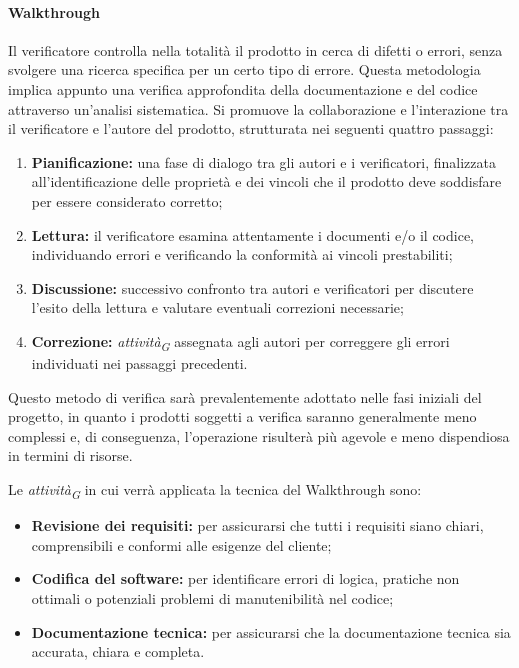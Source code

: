 \paragraph{Walkthrough}
Il verificatore controlla nella totalità il prodotto in cerca di difetti o errori, senza svolgere una ricerca specifica per un certo tipo di errore. Questa metodologia implica appunto una verifica approfondita della documentazione e del codice attraverso un'analisi sistematica. Si promuove la collaborazione e l'interazione tra il verificatore e l'autore del prodotto, strutturata nei seguenti quattro passaggi:

\begin{enumerate}
    \item \textbf{Pianificazione:} 
        una fase di dialogo tra gli autori e i verificatori, finalizzata all'identificazione delle proprietà e dei vincoli che il prodotto deve soddisfare per essere considerato corretto; 

    \item \textbf{Lettura:} 
        il verificatore esamina attentamente i documenti e/o il codice, individuando errori e verificando la conformità ai vincoli prestabiliti; 

    \item \textbf{Discussione:} 
        successivo confronto tra autori e verificatori per discutere l'esito della lettura e valutare eventuali correzioni necessarie; 

    \item \textbf{Correzione:} 
        \textit{attività}\textsubscript{\textit{G}} assegnata agli autori per correggere gli errori individuati nei passaggi precedenti.
\end{enumerate}

Questo metodo di verifica sarà prevalentemente adottato nelle fasi iniziali del progetto, in quanto i prodotti soggetti a verifica saranno generalmente meno complessi e, di conseguenza, l'operazione risulterà più agevole e meno dispendiosa in termini di risorse.

Le \textit{attività}\textsubscript{\textit{G}} in cui verrà applicata la tecnica del Walkthrough sono:
\begin{itemize}
    \item \textbf{Revisione dei requisiti:} 
        per assicurarsi che tutti i requisiti siano chiari, comprensibili e conformi alle esigenze del cliente;
    \item \textbf{Codifica del software:} 
        per identificare errori di logica, pratiche non ottimali o potenziali problemi di manutenibilità nel codice;
    \item \textbf{Documentazione tecnica:} 
        per assicurarsi che la documentazione tecnica sia accurata, chiara e completa. 
\end{itemize}

